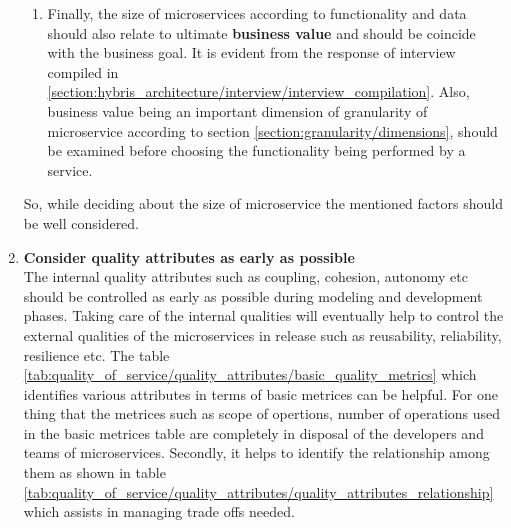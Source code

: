 \begin{enumerate}
\begin{enumerate}
\item Finally, the size of microservices according to functionality and data should also relate to ultimate \textbf{business value} and should be coincide with the business goal. It is evident from the response of interview compiled in \ref{section:hybris_architecture/interview/interview_compilation}. Also, business value being an important dimension of granularity of microservice according to section \ref{section:granularity/dimensions}, should be examined before choosing the functionality being performed by a service.
\end{enumerate}
So, while deciding about the size of microservice the mentioned factors should be well considered.

\item \textbf{Consider quality attributes as early as possible} \\
The internal quality attributes such as coupling, cohesion, autonomy etc should be controlled as early as possible during modeling and development phases. Taking care of the internal qualities will eventually help to control the external qualities of the microservices in release such as reusability, reliability, resilience etc. The table \ref{tab:quality_of_service/quality_attributes/basic_quality_metrics} which identifies various attributes in terms of basic metrices can be helpful. For one thing that the metrices such as scope of opertions, number of operations used in the basic metrices table are completely in disposal of the developers and teams of microservices. Secondly, it helps to identify the relationship among them as shown in table \ref{tab:quality_of_service/quality_attributes/quality_attributes_relationship} which assists in managing trade offs needed.


\end{enumerate}
